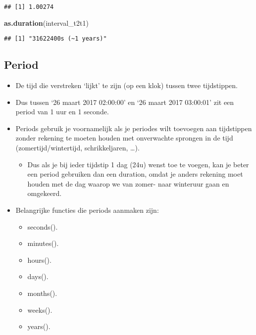 \documentclass[]{memoir}
\newenvironment{Shaded}{\begin{snugshade}}{\end{snugshade}}
\newcommand{\KeywordTok}[1]{\textcolor[rgb]{0.13,0.29,0.53}{\textbf{#1}}}
\newcommand{\NormalTok}[1]{#1}
\providecommand{\tightlist}{%
  \setlength{\itemsep}{0pt}\setlength{\parskip}{0pt}}
\begin{document}
\begin{verbatim}
## [1] 1.00274
\end{verbatim}

\begin{Shaded}
\begin{Highlighting}[]
\KeywordTok{as.duration}\NormalTok{(interval_t2t1)}
\end{Highlighting}
\end{Shaded}

\begin{verbatim}
## [1] "31622400s (~1 years)"
\end{verbatim}

\hypertarget{period}{%
\subsection{Period}\label{period}}

\begin{itemize}
\tightlist
\item
  De tijd die verstreken `lijkt' te zijn (op een klok) tussen twee tijdstippen.
\item
  Dus tussen `26 maart 2017 02:00:00' en `26 maart 2017 03:00:01' zit een period van 1 uur en 1 seconde.
\item
  Periods gebruik je voornamelijk als je periodes wilt toevoegen aan tijdstippen zonder rekening te moeten houden met onverwachte sprongen in de tijd (zomertijd/wintertijd, schrikkeljaren, \ldots{}).

  \begin{itemize}
  \tightlist
  \item
    Dus als je bij ieder tijdstip 1 dag (24u) wenst toe te voegen, kan je beter een period gebruiken dan een duration, omdat je anders rekening moet houden met de dag waarop we van zomer- naar winteruur gaan en omgekeerd.
  \end{itemize}
\item
  Belangrijke functies die periods aanmaken zijn:

  \begin{itemize}
  \tightlist
  \item
    seconds().
  \item
    minutes().
  \item
    hours().
  \item
    days().
  \item
    months().
  \item
    weeks().
  \item
    years().
  \end{itemize}
\end{itemize}
\end{document}
